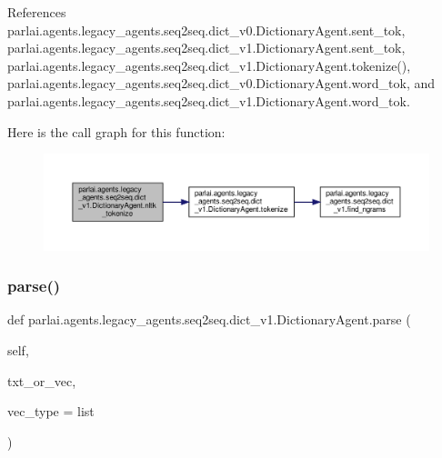 References parlai.\+agents.\+legacy\+\_\+agents.\+seq2seq.\+dict\+\_\+v0.\+Dictionary\+Agent.\+sent\+\_\+tok, parlai.\+agents.\+legacy\+\_\+agents.\+seq2seq.\+dict\+\_\+v1.\+Dictionary\+Agent.\+sent\+\_\+tok, parlai.\+agents.\+legacy\+\_\+agents.\+seq2seq.\+dict\+\_\+v1.\+Dictionary\+Agent.\+tokenize(), parlai.\+agents.\+legacy\+\_\+agents.\+seq2seq.\+dict\+\_\+v0.\+Dictionary\+Agent.\+word\+\_\+tok, and parlai.\+agents.\+legacy\+\_\+agents.\+seq2seq.\+dict\+\_\+v1.\+Dictionary\+Agent.\+word\+\_\+tok.

Here is the call graph for this function\+:
\nopagebreak
\begin{figure}[H]
\begin{center}
\leavevmode
\includegraphics[width=350pt]{classparlai_1_1agents_1_1legacy__agents_1_1seq2seq_1_1dict__v1_1_1DictionaryAgent_a63a722c3a9b9ff68a06479e2e6539fd8_cgraph}
\end{center}
\end{figure}
\mbox{\label{classparlai_1_1agents_1_1legacy__agents_1_1seq2seq_1_1dict__v1_1_1DictionaryAgent_acae89a6d1049de6fd2cab06c7804dcdd}} 
\subsubsection{\texorpdfstring{parse()}{parse()}}
{\footnotesize\ttfamily def parlai.\+agents.\+legacy\+\_\+agents.\+seq2seq.\+dict\+\_\+v1.\+Dictionary\+Agent.\+parse (\begin{DoxyParamCaption}\item[{}]{self,  }\item[{}]{txt\+\_\+or\+\_\+vec,  }\item[{}]{vec\+\_\+type = {\ttfamily list} }\end{DoxyParamCaption})}


